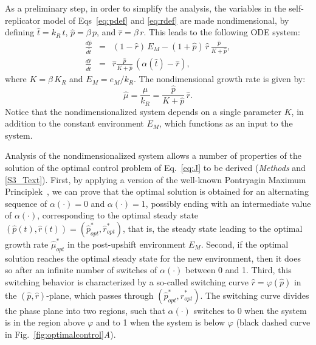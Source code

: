 As a preliminary step, in order to simplify the analysis, the variables in the self-replicator model of Eqs~\ref{eq:pdef} and \ref{eq:rdef} are made nondimensional, by defining $\hat{t} = k_R\, t$, $\hat{p} = \beta\, p$, and $\hat{r} = \beta\, r$.
This leads to the following ODE system:
\begin{eqnarray}
\frac{d\hat{p}}{d\hat{t}} &=& (1-\hat{r})\, E_M - (1+\hat{p})\, \hat{r} \, \frac{\hat{p}}{K+\hat{p}}, \label{eq:pdefnondim}\\
\frac{d\hat{r}}{d\hat{t}} &=& \hat{r} \frac{\hat{p}}{K + \hat{p}} \, (\alpha (\hat{t}) - \hat{r}), \label{eq:rdefnondim}
\end{eqnarray}
where $K= \beta\, K_R$ and $E_M= e_M / k_R$.
The nondimensional growth rate is given by:
\begin{equation}
\label{eq:munondim}
\hat{\mu} = \frac{\mu}{k_R} = \frac{\hat{p}}{K + \hat{p}} \, \hat{r} .
\end{equation}
Notice that the nondimensionalized system depends on a single parameter $K$, in addition to the constant environment $E_M$, which functions as an input to the system.

Analysis of the nondimensionalized system allows a number of properties of the solution of the optimal control problem of Eq.~\ref{eq:J} to be derived (\textit{Methods} and \ref{S3_Text}).
First, by applying a version of the well-known Pontryagin Maximum Principlek~\cite{carlson_infinite_1991}, we can prove that the optimal solution is obtained for an alternating sequence of $\alpha(\cdot)=0$ and $\alpha(\cdot)=1$, possibly ending with an intermediate value of $\alpha(\cdot)$, corresponding to the optimal steady state $(\hat{p}(t),\hat{r}(t))=(\hat{p}_{opt}^*,\hat{r}_{opt}^*)$, that is, the steady state leading to the optimal growth rate $\hat{\mu}_{opt}^*$ in the post-upshift environment $E_M$.
Second, if the optimal solution reaches the optimal steady state for the new environment, then it does so after an infinite number of switches of $\alpha (\cdot)$ between 0 and 1.
Third, this switching behavior is characterized by a so-called switching curve $\hat{r}=\varphi(\hat{p})$ in the $(\hat{p},\hat{r})$-plane, which passes through $(\hat{p}_{opt}^*,\hat{r}_{opt}^*)$.
The switching curve divides the phase plane into two regions, such that $\alpha(\cdot)$ switches to 0 when the system is in the region above $\varphi$ and to 1 when the system is below $\varphi$ (black dashed curve in Fig.~\ref{fig:optimalcontrol}\textit{A}).

